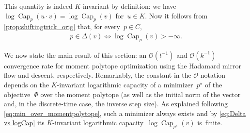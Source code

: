 \documentclass[11pt,letterpaper]{article}
\numberwithin{equation}{section}
\DeclareMathOperator{\Capacity}{Cap}
\begin{document}
\noindent
This quantity is indeed $K$-invariant by definition:
we have $\log\Capacity_p(u \cdot v) = \log\Capacity_p(v)$ for~$u \in K$.
Now it follows from \cref{prop:shiftingtrick_orig} that, for every~$p \in C$,
\begin{align}\label{eq:Delta vs logCap}
    p \in \Delta(v)
\iff \log\Capacity_p(v) > -\infty.
\end{align}

We now state the main result of this section: an $\mathcal{O}(t^{-1})$ and $\mathcal{O}(k^{-1})$ convergence rate for moment polytope optimization using the Hadamard mirror flow and descent, respectively.
Remarkably, the constant in the $\mathcal{O}$ notation depends on the $K$-invariant logarithmic capacity of a minimizer~$p^\star$ of the objective~$\Phi$ over the moment polytope (as well as the initial norm of the vector and, in the discrete-time case, the inverse step size).
As explained following \cref{eq:min_over_momentpolytope}, such a minimizer always exists and by \cref{eq:Delta vs logCap} its $K$-invariant logarithmic capacity~$\log\Capacity_{p^\star}(v)$ is~finite.
\end{document}
